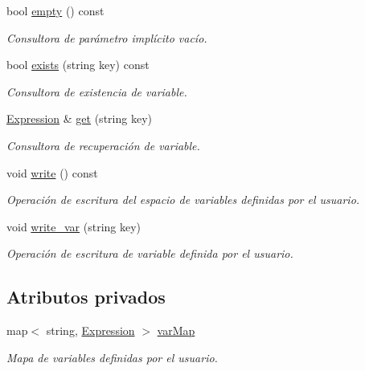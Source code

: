 \begin{DoxyCompactItemize}
bool \hyperlink{class_variable_space_afe850fa6a1dd65e8dffda97d70b7bd93}{empty} () const 
\begin{DoxyCompactList}\small\item\em Consultora de parámetro implícito vacío. \end{DoxyCompactList}\item 
bool \hyperlink{class_variable_space_abb2147dc634abb8256c9c35b7a170b03}{exists} (string key) const 
\begin{DoxyCompactList}\small\item\em Consultora de existencia de variable. \end{DoxyCompactList}\item 
\hyperlink{class_expression}{Expression} \& \hyperlink{class_variable_space_ad849868abb2870711230f7784e30816c}{get} (string key)
\begin{DoxyCompactList}\small\item\em Consultora de recuperación de variable. \end{DoxyCompactList}\item 
void \hyperlink{class_variable_space_a98f9eac695830e33d68341515bfd0b4f}{write} () const 
\begin{DoxyCompactList}\small\item\em Operación de escritura del espacio de variables definidas por el usuario. \end{DoxyCompactList}\item 
void \hyperlink{class_variable_space_a15b32633f6bf18d04323ea9f55f40b24}{write\+\_\+var} (string key)
\begin{DoxyCompactList}\small\item\em Operación de escritura de variable definida por el usuario. \end{DoxyCompactList}\end{DoxyCompactItemize}
\subsection*{Atributos privados}
\begin{DoxyCompactItemize}
\item 
map$<$ string, \hyperlink{class_expression}{Expression} $>$ \hyperlink{class_variable_space_a5af4ff4cfb476da8de2ffd88e511dd01}{var\+Map}
\begin{DoxyCompactList}\small\item\em Mapa de variables definidas por el usuario. \end{DoxyCompactList}\end{DoxyCompactItemize}


